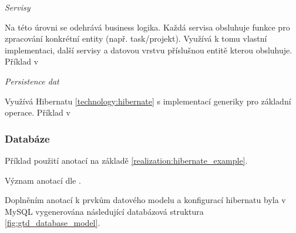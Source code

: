 \documentclass[thesis=B,czech]{FITthesis}[2012/06/26]
\begin{document}
\textit{Servisy}

Na této úrovni se odehrává business logika. Každá servisa obsluhuje funkce pro zpracování konkrétní entity (např. task/projekt). Využívá k tomu vlastní implementaci, další servisy a datovou vrstvu příslušnou entitě kterou obsluhuje. Příklad v 



\textit{Persistence dat}

Využívá Hibernatu \ref{technology:hibernate} s implementací generiky\cite{realization_hibernate_generic} pro základní operace. Příklad v 



\subsubsection{Databáze}

Příklad použití anotací na základě \ref{realization:hibernate_example}.



Význam anotací dle \cite{design_hibernate_annotations}.

Doplněním anotací k prvkům datového modelu a konfigurací hibernatu byla v MySQL vygenerována následující databázová struktura \ref{fig:gtd_database_model}.
\end{document}
